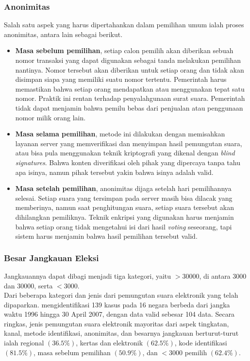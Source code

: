 \documentclass[12pt, a4paper, final]{article}
\begin{document}
\subsubsection{Anonimitas}

Salah satu aspek yang harus dipertahankan dalam pemilihan umum ialah proses anonimitas, antara lain sebagai berikut.

\begin{itemize}
    \setlength\itemsep{-0.5em}
    \item \textbf{Masa sebelum pemilihan}, setiap calon pemilih akan diberikan sebuah nomor transaksi yang dapat digunakan sebagai tanda melakukan pemilihan nantinya. Nomor tersebut akan diberikan untuk setiap orang dan tidak akan disimpan siapa yang memiliki suatu nomor tertentu. Pemerintah harus memastikan bahwa setiap orang mendapatkan atau menggunakan tepat satu nomor. Praktik ini rentan terhadap penyalahgunaan surat suara. Pemerintah tidak dapat menjamin bahwa pemilu bebas dari penjualan atau penggunaan nomor milik orang lain.
    \item \textbf{Masa selama pemilihan}, metode ini dilakukan dengan memisahkan layanan server yang memverifikasi dan menyimpan hasil pemungutan suara, atau bisa pula menggunakan teknik kriptografi yang dikenal dengan \textit{blind signatures}. Bahwa konten diverifikasi oleh pihak yang dipercaya tanpa tahu apa isinya, namun pihak tersebut yakin bahwa isinya adalah valid.
    \item \textbf{Masa setelah pemilihan}, anonimitas dijaga setelah hari pemilihannya selesai. Setiap suara yang tersimpan pada server masih bisa dilacak yang memberinya, namun saat penghitungan suara, setiap suara tersebut akan dihilangkan pemiliknya. Teknik enkripsi yang digunakan harus menjamin bahwa setiap orang tidak mengetahui isi dari hasil \textit{voting} seseorang, tapi sistem harus menjamin bahwa hasil pemilihan tersebut valid.
\end{itemize}

\subsubsection{Besar Jangkauan Eleksi}

Jangkauannya dapat dibagi menjadi tiga kategori, yaitu $> 30000$, di antara $3000$ dan $30000$, serta $< 3000$.\\

Dari beberapa kategori dan jenis dari pemungutan suara elektronik yang telah dipaparkan. \cite{review1} mengidentifikasi 139 kasus pada 16 negara berbeda dari jangka waktu 1996 hingga 30 April 2007, dengan data valid sebesar 104 data. Secara ringkas, jenis pemungutan suara elektronik mayoritas dari aspek tingkatan, kanal, metode identifikasi, anonimitas, dan besarnya jangkauan berturut-turut ialah regional $(36.5\%)$, kertas dan elektronik $(62.5\%)$, kode identifikasi $(81.5\%)$, masa sebelum pemilihan $(50.9\%)$, dan $< 3000$ pemilih $(62.4\%)$.
\end{document}
